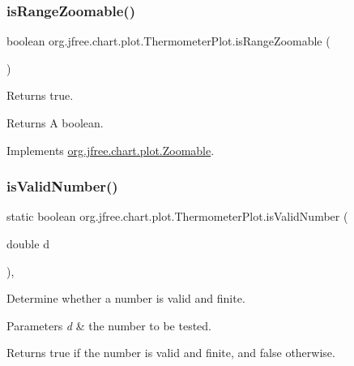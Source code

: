 \subsubsection{\texorpdfstring{is\+Range\+Zoomable()}{isRangeZoomable()}}
{\footnotesize\ttfamily boolean org.\+jfree.\+chart.\+plot.\+Thermometer\+Plot.\+is\+Range\+Zoomable (\begin{DoxyParamCaption}{ }\end{DoxyParamCaption})}

Returns {\ttfamily true}.

\begin{DoxyReturn}{Returns}
A boolean. 
\end{DoxyReturn}


Implements \mbox{\hyperlink{interfaceorg_1_1jfree_1_1chart_1_1plot_1_1_zoomable_aee592b4d6f620a0571974e29247a66b1}{org.\+jfree.\+chart.\+plot.\+Zoomable}}.

\mbox{\label{classorg_1_1jfree_1_1chart_1_1plot_1_1_thermometer_plot_ae9e9203eee4b398bef09190f61f8a369}} 
\subsubsection{\texorpdfstring{is\+Valid\+Number()}{isValidNumber()}}
{\footnotesize\ttfamily static boolean org.\+jfree.\+chart.\+plot.\+Thermometer\+Plot.\+is\+Valid\+Number (\begin{DoxyParamCaption}\item[{double}]{d }\end{DoxyParamCaption})\hspace{0.3cm}{\ttfamily [static]}, {\ttfamily [protected]}}

Determine whether a number is valid and finite.


\begin{DoxyParams}{Parameters}
{\em d} & the number to be tested.\\
\hline
\end{DoxyParams}
\begin{DoxyReturn}{Returns}
{\ttfamily true} if the number is valid and finite, and {\ttfamily false} otherwise. 
\end{DoxyReturn}
\mbox{\label{classorg_1_1jfree_1_1chart_1_1plot_1_1_thermometer_plot_a8d5206541bc648f7cc920b5183d38aa2}} 
